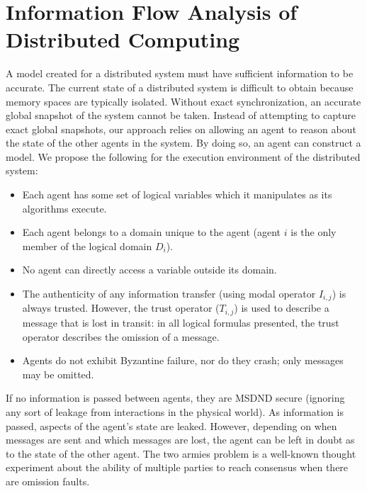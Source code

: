 

\chapter{Information Flow Analysis of Distributed Computing}

A model created for a distributed system must have sufficient information to be accurate.
The current state of a distributed system is difficult to obtain because memory spaces are typically isolated.
Without exact synchronization, an accurate global snapshot of the system cannot be taken.
Instead of attempting to capture exact global snapshots, our approach relies on allowing an agent to reason about the state of the other agents in the system.
By doing so, an agent can construct a model.
We propose the following for the execution environment of the distributed system:

\begin{itemize}
    \item Each agent has some set of logical variables which it manipulates as its algorithms execute.
    \item Each agent belongs to a domain unique to the agent (agent $i$ is the only member of the logical domain $D_i$).
    \item No agent can directly access a variable outside its domain.
    \item The authenticity of any information transfer (using modal operator $I_{i,j}$) is always trusted. However, the trust operator ($T_{i,j}$) is used to describe a message that is lost in transit: in all logical formulas presented, the trust operator describes the omission of a message.
    \item Agents do not exhibit Byzantine failure, nor do they crash; only messages may be omitted.
\end{itemize}

If no information is passed between agents, they are MSDND secure (ignoring any sort of leakage from interactions in the physical world).
As information is passed, aspects of the agent's state are leaked.
However, depending on when messages are sent and which messages are lost, the agent can be left in doubt as to the state of the other agent.
The two armies problem is a well-known thought experiment about the ability of multiple parties to reach consensus when there are omission faults.

